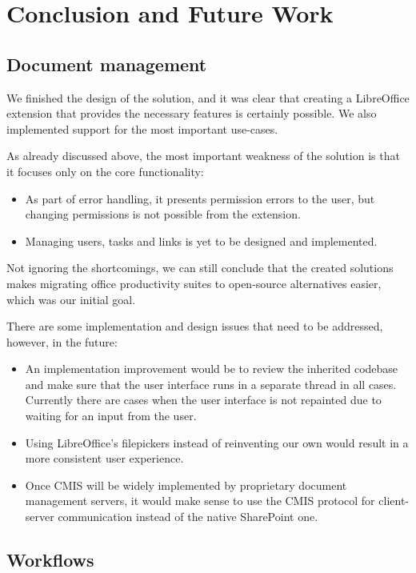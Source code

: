 \chapter{Conclusion and Future Work}

\section{Document management}

We finished the design of the solution, and it was clear that creating a
LibreOffice extension that provides the necessary features is certainly
possible. We also implemented support for the most important use-cases.

As already discussed above, the most important weakness of the solution is that
it focuses only on the core functionality:

\begin{itemize}
\item As part of error handling, it presents permission errors to the user, but
changing permissions is not possible from the extension.
\item Managing users, tasks and links is yet to be designed and implemented.
\end{itemize}

Not ignoring the shortcomings, we can still conclude that the created solutions
makes migrating office productivity suites to open-source alternatives easier,
which was our initial goal.

There are some implementation and design issues that need to be addressed,
however, in the future:

\begin{itemize}
\item An implementation improvement would be to review the inherited codebase
and make sure that the user interface runs in a separate thread in all cases.
Currently there are cases when the user interface is not repainted due to
waiting for an input from the user.
\item Using LibreOffice's filepickers instead of reinventing our own would
result in a more consistent user experience.
\item Once CMIS will be widely implemented by proprietary document management
servers, it would make sense to use the CMIS protocol for client-server
communication instead of the native SharePoint one.
\end{itemize}

\section{Workflows}

